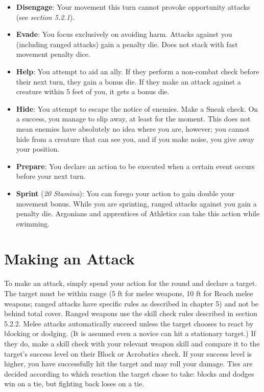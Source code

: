 \begin{itemize}
	\item \textbf{Disengage}: Your movement this turn cannot provoke opportunity attacks (see \textit{section 5.2.1}).
	\item\textbf{Evade}: You focus exclusively on avoiding harm. Attacks against you (including ranged attacks) gain a penalty die. Does not stack with fast movement penalty dice.
	\item \textbf{Help}: You attempt to aid an ally. If they perform a non-combat check before their next turn, they gain a bonus die. If they make an attack against a creature within 5 feet of you, it gets a bonus die.
	\item \textbf{Hide}: You attempt to escape the notice of enemies. Make a Sneak check. On a success, you manage to slip away, at least for the moment. This does not mean enemies have absolutely no idea where you are, however; you cannot hide from a creature that can see you, and if you make noise, you give away your position.
	\item \textbf{Prepare}: You declare an action to be executed when a certain event occurs before your next turn.
	\item \textbf{Sprint} (\textit{20 Stamina}): You can forego your action to gain double your movement bonus. While you are sprinting, ranged attacks against you gain a penalty die. Argonians and apprentices of Athletics can take this action while swimming.
\end{itemize}

\section{Making an Attack}

To make an attack, simply spend your action for the round and declare a target. The target must be within range (5 ft for melee weapons, 10 ft for Reach melee weapons; ranged attacks have specific rules as described in chapter 5) and not be behind total cover. Ranged weapons use the skill check rules described in section 5.2.2. Melee attacks automatically succeed unless the target chooses to react by blocking or dodging. (It is assumed even a novice can hit a stationary target.) If they do, make a skill check with your relevant weapon skill and compare it to the target's success level on their Block or Acrobatics check. If your success level is higher, you have successfully hit the target and may roll your damage. Ties are decided according to which reaction the target chose to take: blocks and dodges win on a tie, but fighting back loses on a tie.\\

